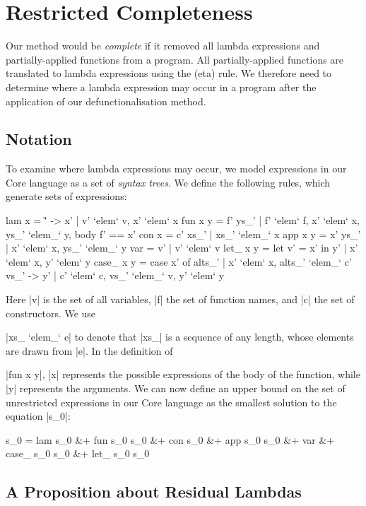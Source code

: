 \section{Restricted Completeness}
\label{sec:completeness}

Our method would be \textit{complete} if it removed all lambda expressions and partially-applied functions from a program. All partially-applied functions are translated to lambda expressions using the (eta) rule. We therefore need to determine where a lambda expression may occur in a program after the application of our defunctionalisation method.

\subsection{Notation}

To examine where lambda expressions may occur, we model expressions in our Core language as a set of \textit{syntax trees}. We define the following rules, which generate sets of expressions:

\ignore\begin{code}
lam x      = {\v' -> x' | v' `elem` v, x' `elem` x}
fun x y    = {f' ys_' | f' `elem` f, x' `elem` x, ys_' `elem_` y, body f' == x'}
con x      = {c' xs_' | xs_' `elem_` x}
app x y    = {x' ys_' | x' `elem` x, ys_' `elem_` y}
var        = {v' | v' `elem` v}
let_ x y   = {let v' = x' in y' | x' `elem` x, y' `elem` y}
case_ x y  = {case  x' of alts_' | x' `elem` x,
                    alts_' `elem_` {c' vs_' -> y' | c' `elem` c, vs_' `elem_` v, y' `elem` y}}
\end{code}

Here |v| is the set of all variables, |f| the set of function names, and |c| the set of constructors. We use \ignore|xs_ `elem_` e| to denote that |xs_| is a sequence of any length, whose elements are drawn from |e|. In the definition of \ignore|fun x y|, |x| represents the possible expressions of the body of the function, while |y| represents the arguments. We can now define an upper bound on the set of unrestricted expressions in our Core language as the smallest solution to the equation |s_0|:

\ignore\begin{code}
s_0  =  lam s_0 &+ fun s_0 s_0 &+ con s_0 &+ app s_0 s_0 &+ var &+
        case_ s_0 s_0 &+ let_ s_0 s_0
\end{code}

\subsection{A Proposition about Residual Lambdas}

